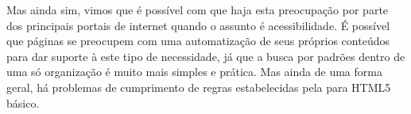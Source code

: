 \documentclass[
	12pt,				%
	oneside,			%
	a4paper,			%
	english,			%
	brazil				%
	]{abntex2ppgsi}
\begin{document}
Mas ainda sim, vimos que é possível com que haja esta preocupação por parte dos principais portais de internet quando o assunto é acessibilidade. É possível que páginas se preocupem com uma automatização de seus próprios conteúdos para dar suporte à este tipo de necessidade, já que a busca por padrões dentro de uma só organização é muito mais simples e prática. Mas ainda de uma forma geral, há problemas de cumprimento de regras estabelecidas pela  para HTML5 básico. 


\postextual




\end{document}
